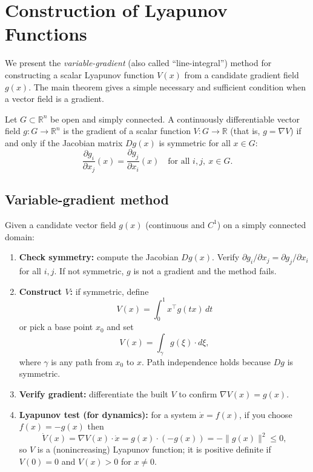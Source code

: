 \section{Construction of Lyapunov Functions}

We present the \emph{variable-gradient} (also called ``line-integral'') method for constructing a scalar Lyapunov function \(V(x)\) from a candidate gradient field \(g(x)\). The main theorem gives a simple necessary and sufficient condition when a vector field is a gradient.

\begin{theorem}
Let \(G\subset\mathbb{R}^n\) be open and simply connected. A continuously differentiable vector field \(g:G\to\mathbb{R}^n\) is the gradient of a scalar function \(V:G\to\mathbb{R}\) (that is, \(g=\nabla V\)) if and only if the Jacobian matrix \(Dg(x)\) is symmetric for all \(x\in G\):
\[
\frac{\partial g_i}{\partial x_j}(x)=\frac{\partial g_j}{\partial x_i}(x)
\quad\text{for all }i,j,\ x\in G.
\]
\end{theorem}

\subsection{Variable-gradient method}
Given a candidate vector field \(g(x)\) (continuous and \(C^1\)) on a simply connected domain:

\begin{enumerate}
  \item \textbf{Check symmetry:} compute the Jacobian \(Dg(x)\). Verify \(\partial g_i/\partial x_j=\partial g_j/\partial x_i\) for all \(i,j\). If not symmetric, \(g\) is not a gradient and the method fails.
  \item \textbf{Construct \(V\):} if symmetric, define
  \[
  V(x)=\int_{0}^{1} x^\top g(tx)\,dt
  \]
  or pick a base point \(x_0\) and set
  \[
  V(x)=\int_{\gamma} g(\xi)\cdot d\xi,
  \]
  where \(\gamma\) is any path from \(x_0\) to \(x\). Path independence holds because \(Dg\) is symmetric.
  \item \textbf{Verify gradient:} differentiate the built \(V\) to confirm \(\nabla V(x)=g(x)\).
  \item \textbf{Lyapunov test (for dynamics):} for a system \(\dot x=f(x)\), if you choose \(f(x)=-g(x)\) then
  \[
  \dot V(x)=\nabla V(x)\cdot\dot x = g(x)\cdot(-g(x))=-\|g(x)\|^2\le 0,
  \]
  so \(V\) is a (nonincreasing) Lyapunov function; it is positive definite if \(V(0)=0\) and \(V(x)>0\) for \(x\neq0\).
\end{enumerate}

